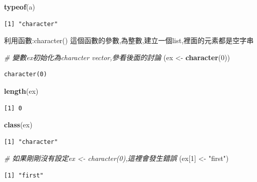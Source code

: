 \documentclass[]{book}
\newenvironment{Shaded}{\begin{snugshade}}{\end{snugshade}}
\newcommand{\CommentTok}[1]{\textcolor[rgb]{0.56,0.35,0.01}{\textit{#1}}}
\newcommand{\DecValTok}[1]{\textcolor[rgb]{0.00,0.00,0.81}{#1}}
\newcommand{\KeywordTok}[1]{\textcolor[rgb]{0.13,0.29,0.53}{\textbf{#1}}}
\newcommand{\NormalTok}[1]{#1}
\newcommand{\StringTok}[1]{\textcolor[rgb]{0.31,0.60,0.02}{#1}}
\theoremstyle{definition}
\theoremstyle{definition}
\theoremstyle{definition}
\theoremstyle{remark}
\begin{document}
\begin{Shaded}
\begin{Highlighting}[]
\KeywordTok{typeof}\NormalTok{(a)}
\end{Highlighting}
\end{Shaded}

\begin{verbatim}
[1] "character"
\end{verbatim}

利用函數:character()
這個函數的參數,為整數,建立一個list,裡面的元素都是空字串

\begin{Shaded}
\begin{Highlighting}[]
\CommentTok{# 變數ex初始化為character vector,參看後面的討論}
\NormalTok{(ex <-}\StringTok{ }\KeywordTok{character}\NormalTok{(}\DecValTok{0}\NormalTok{))}
\end{Highlighting}
\end{Shaded}

\begin{verbatim}
character(0)
\end{verbatim}

\begin{Shaded}
\begin{Highlighting}[]
\KeywordTok{length}\NormalTok{(ex)}
\end{Highlighting}
\end{Shaded}

\begin{verbatim}
[1] 0
\end{verbatim}

\begin{Shaded}
\begin{Highlighting}[]
\KeywordTok{class}\NormalTok{(ex)}
\end{Highlighting}
\end{Shaded}

\begin{verbatim}
[1] "character"
\end{verbatim}

\begin{Shaded}
\begin{Highlighting}[]
\CommentTok{# 如果剛剛沒有設定ex <- character(0),這裡會發生錯誤}
\NormalTok{(ex[}\DecValTok{1}\NormalTok{] <-}\StringTok{ "first"}\NormalTok{)}
\end{Highlighting}
\end{Shaded}

\begin{verbatim}
[1] "first"
\end{verbatim}
\end{document}
